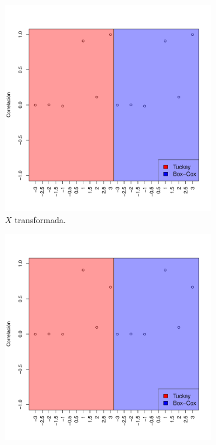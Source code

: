 \documentclass[paper=leter, fontsize=11pt]{scrartcl}
\numberwithin{equation}{section}		%
\numberwithin{figure}{section}			%
\numberwithin{table}{section}				%
\begin{document}
\begin{figure}
    \begin{subfigure}{.5\textwidth}
        \centering
        \includegraphics[scale=0.4]{xTcorr3.pdf}
        \caption{$X$ transformada.}
        \label{xTcorr3}
    \end{subfigure}
    \begin{subfigure}{0.5\textwidth}
        \centering
        \includegraphics[scale=0.4]{yTcorr3.pdf}

\end{subfigure}
\end{figure}
\end{document}
